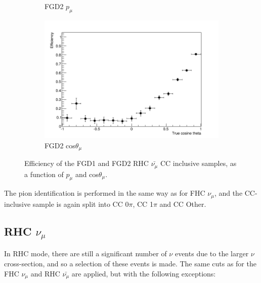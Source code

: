 \begin{figure}[t]
\begin{subfigure}{.48\textwidth}
  \caption{FGD2 $p_{\mu}$}
\end{subfigure}
\begin{subfigure}{.48\textwidth}
  \centering
  \includegraphics[width=0.95\linewidth]{figs/effcosfgd2numubar}
  \caption{FGD2 cos$\theta_{\mu}$}
\end{subfigure}
\caption{Efficiency of the FGD1 and FGD2 RHC $\bar{\nu_{\mu}}$ CC inclusive samples, as a function of $p_{\mu}$ and cos$\theta_{\mu}$.}
\label{fig:numubareff}
\end{figure}

The pion identification is performed in the same way as for FHC $\nu_{\mu}$, and the CC-inclusive sample is again split into CC 0$\pi$, CC 1$\pi$ and CC Other.

\subsection{RHC $\nu_{\mu}$}

In RHC mode, there are still a significant number of $\nu$ events due to the larger $\nu$ cross-section, and so a selection of these events is made. The same cuts as for the FHC $\nu_{\mu}$ and RHC $\bar{\nu_{\mu}}$ are applied, but with the following exceptions:

